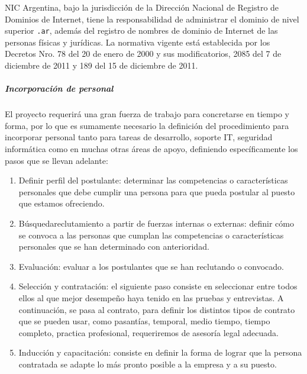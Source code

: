     NIC Argentina, bajo la jurisdicción de la Dirección Nacional de Registro de Dominios de Internet, tiene la responsabilidad de administrar el dominio de nivel superior \texttt{.ar}, además del registro de nombres de dominio de Internet de las personas físicas y jurídicas.
    La normativa vigente está establecida por los Decretos Nro. 78 del 20 de enero de 2000 y sus modificatorios, 2085 del 7 de diciembre de 2011 y 189 del 15 de diciembre de 2011.
    
\subparagraph{Incorporación de personal}
    
    El proyecto requerirá una gran fuerza de trabajo para concretarse en tiempo y forma, por lo que es sumamente necesario la definición del procedimiento para incorporar personal tanto para tareas de desarrollo, soporte IT, seguridad informática como en muchas otras áreas de apoyo, definiendo específicamente los pasos que se llevan adelante:
    
    \begin{enumerate}
        \item Definir perfil del postulante: determinar las competencias o características personales que debe cumplir una persona para que pueda postular al puesto que estamos ofreciendo.
        \item Búsqueda\/reclutamiento a partir de fuerzas internas o externas: definir cómo se convoca a las personas que cumplan las competencias o características personales que se han determinado con anterioridad.
        \item Evaluación: evaluar a los postulantes que se han reclutando o convocado.
        \item Selección y contratación: el siguiente paso consiste en seleccionar entre todos ellos al que mejor desempeño haya tenido en las pruebas y entrevistas.
        A continuación, se pasa al contrato, para definir los distintos tipos de contrato que se pueden usar, como pasantías, temporal, medio tiempo, tiempo completo, practica profesional, requeriremos de asesoría legal adecuada.
        \item Inducción y capacitación: consiste en definir la forma de lograr que la persona contratada se adapte lo más pronto posible a la empresa y a su puesto.
    \end{enumerate}
   
